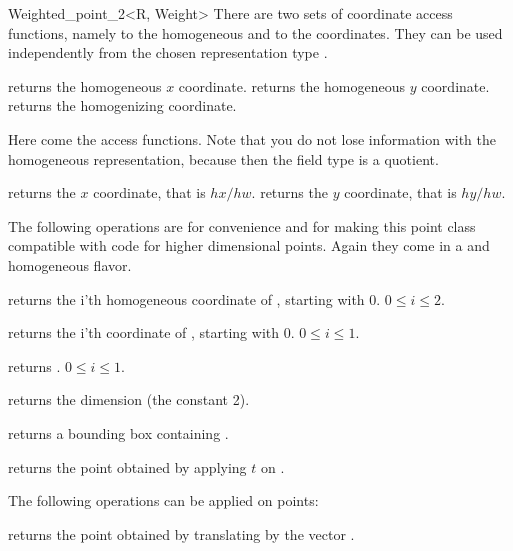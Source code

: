 \begin{ccRefClass} {Weighted_point_2<R, Weight>}
There are two sets of coordinate access functions, namely to the
homogeneous and to the  coordinates. They can be used
independently from the chosen representation type .

       {returns the homogeneous $x$ coordinate.}
\ccGlue
{}
       {returns the homogeneous $y$ coordinate.}
\ccGlue
{}
       {returns the homogenizing  coordinate.}

Here come the  access functions. Note that you do 
not lose information with the homogeneous representation, because then the field
type is a quotient.

    {returns the  $x$ coordinate, that is $hx/hw$.}
\ccGlue
{}
    {returns the  $y$ coordinate, that is $hy/hw$.}


The following operations are for convenience and for making this
point class compatible with code for higher dimensional points.
Again they come in a  and homogeneous flavor.

       {returns the i'th homogeneous coordinate of \ccVar, starting with 0.
        \ccPrecond $0\leq i \leq 2$.}

       {returns the i'th  coordinate of \ccVar, 
        starting with 0.
        \ccPrecond $0\leq i \leq 1$.}

       {returns .
        \ccPrecond $0\leq i \leq 1$.}

       {returns the dimension (the constant 2).}

       {returns a bounding box containing \ccVar.}

       {returns the point obtained by applying $t$ on \ccVar.}



The following operations can be applied on points:


       {returns the point obtained by translating  by the 
        vector .}


\end{ccRefClass}

